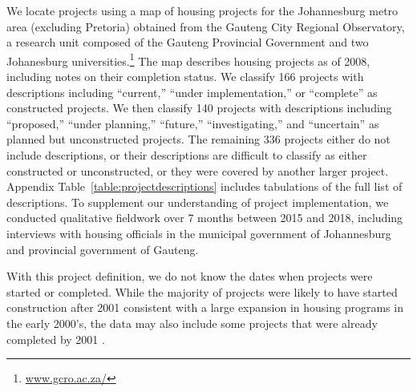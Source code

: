 \documentclass[12pt]{article}
\newcommand{\rv}{}
\begin{document}
We locate projects using a map of housing projects \rv{for the Johannesburg metro area (excluding Pretoria)} obtained from the Gauteng City Regional Observatory, a research unit composed of the Gauteng Provincial Government and two Johanesburg universities.\footnote{\href{url}{www.gcro.ac.za/}}  The map describes housing projects as of 2008, including notes on their completion status.  We classify 166 projects with descriptions including ``current,'' ``under implementation,'' or ``complete'' as constructed projects.  We then classify 140 projects with descriptions including ``proposed,'' ``under planning,'' ``future,'' ``investigating,'' and ``uncertain'' as planned but unconstructed projects.  The remaining 336 projects either do not include descriptions, or their descriptions are difficult to classify as either constructed or unconstructed, or they were covered by another larger project.  Appendix Table~\ref{table:projectdescriptions} includes tabulations of the full list of descriptions.  To supplement our understanding of project implementation, we conducted qualitative fieldwork over 7 months between 2015 and 2018, including interviews with housing officials in the municipal government of Johannesburg and provincial government of Gauteng.  

\rv{With this project definition, we do not know the dates when projects were started or completed.  While the majority of projects were likely to have started construction after 2001 consistent with a large expansion in housing programs in the early 2000's, the data may also include some projects that were already completed by 2001  \citep{bng}.}


\end{document}
